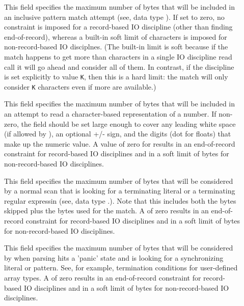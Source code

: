 \begin{description}
\item[] This field specifies the maximum number of
  bytes that will be included in an inclusive pattern match attempt
  (see, \eg{} data type ).  If set to zero, no
   constraint is imposed for a record-based IO
  discipline (other than finding end-of-record), whereas a built-in
  soft limit of  characters is imposed for
  non-record-based IO disciplnes.  (The built-in limit is soft because
  if the match happens to get more than 
  characters in a single IO discipline read call it will go ahead and
  consider all of them.  In contrast, if the discipline
   is set explicitly to value \texttt{K}, then this is
  a hard limit: the match will only consider \texttt{K} characters
  even if more are available.)

\item[] This field specifies the maximum number of
   bytes that will be included in an attempt to read a character-based
   representation of a number.  If non-zero, the field should be set
   large enough to cover any leading white space (if allowed by
   ), an optional +/- sign, and the digits (dot
   \etc{} for floats) that make up the numeric value.  A value of zero
   for  results in an end-of-record constraint for
   record-based IO disciplines and in a soft limit of
    bytes for non-record-based IO
   disciplines.

\item[] This field specifies the maximum number of bytes
   that will be considered by a normal scan that is looking for a
   terminating literal or a terminating regular expressin (see, \eg{}
   data type .).  Note that this includes both the
   bytes skipped plus the bytes used for the match.  A 
   of zero results in an end-of-record constraint for record-based IO
   disciplines and in a soft limit of  bytes
   for non-record-based IO disciplines.
  
\item[] This field specifies the maximum number of
  bytes that will be considered by when 
  parsing hits a 'panic' state and is looking for a synchronizing
  literal or pattern.  See, for example, termination conditions for
  user-defined array types.  A  of zero results in an
  end-of-record constraint for record-based IO disciplines and in a
  soft limit of  bytes for non-record-based IO
  disciplines.
\end{description}


